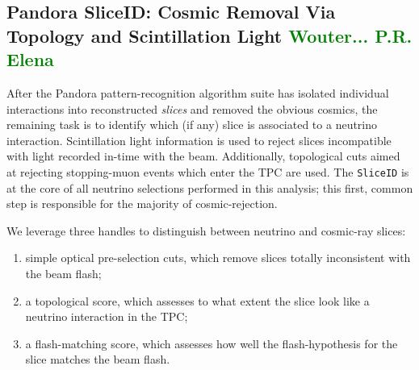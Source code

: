 \subsection{Pandora SliceID: Cosmic Removal Via Topology and Scintillation Light \textcolor{green}{Wouter... P.R. Elena}}
\label{sec:sliceID:SliceID}
\par After the Pandora pattern-recognition algorithm suite has isolated individual interactions into reconstructed \emph{slices} and removed the obvious cosmics, the remaining task is to identify which (if any) slice is associated to a neutrino interaction. Scintillation light information is used to reject slices incompatible with light recorded in-time with the beam. Additionally, topological cuts aimed at rejecting stopping-muon events which enter the TPC are used. The \texttt{SliceID} is at the core of all neutrino selections performed in this analysis; this first, common step is responsible for the majority of cosmic-rejection.
\\
\par We leverage three handles to distinguish between neutrino and cosmic-ray slices:
\begin{enumerate}
    \item simple optical pre-selection cuts, which remove slices totally inconsistent with the beam flash;
    \item a topological score, which assesses to what extent the slice look like a neutrino interaction in the TPC;
    \item a flash-matching score, which assesses how well the flash-hypothesis for the slice matches the beam flash.
\end{enumerate}

